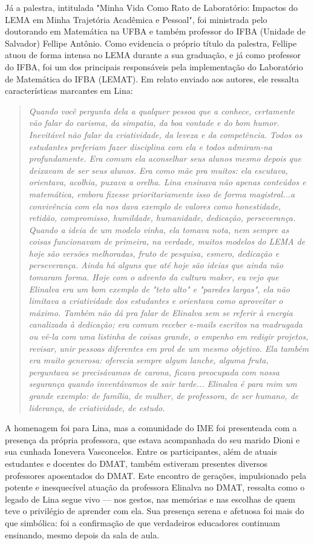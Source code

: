 \documentclass{hipatia}
\begin{document}
Já a palestra, intitulada "Minha Vida Como Rato de Laboratório: Impactos do LEMA em Minha Trajetória Acadêmica e Pessoal", foi ministrada pelo doutorando em Matemática na UFBA e também professor do IFBA (Unidade de Salvador) Fellipe Antônio. Como evidencia o próprio título da palestra, Fellipe atuou de forma intensa no LEMA durante a sua graduação, e já como professor do IFBA, foi um dos principais responsáveis pela implementação do Laboratório de Matemática do IFBA (LEMAT). Em relato enviado aos autores, ele ressalta características marcantes em Lina:
\begin{quote}
    \textit{Quando você pergunta dela a qualquer pessoa que a conhece, certamente vão falar do carisma, da simpatia, da boa vontade e do bom humor. Inevitável não falar da criatividade, da leveza e da competência. Todos os estudantes preferiam fazer disciplina com ela e todos admiram-na profundamente. Era comum ela aconselhar seus alunos mesmo depois que deixavam de ser seus alunos. Era como mãe pra muitos: ela escutava, orientava, acolhia, puxava a orelha. Lina ensinava não apenas conteúdos e matemática, embora fizesse prioritariamente isso de forma magistral...a convivência com ela nos dava exemplo de valores como honestidade, retidão, compromisso, humildade, humanidade, dedicação, perseverança. Quando a ideia de um modelo vinha, ela tomava nota, nem sempre as coisas funcionavam de primeira, na verdade, muitos modelos do LEMA de hoje são versões melhoradas, fruto de pesquisa, esmero, dedicação e perseverança. Ainda há alguns que até hoje são ideias que ainda não tomaram forma. Hoje com o advento da cultura maker, eu vejo que Elinalva era um bom exemplo de "teto alto" e "paredes largas", ela não limitava a criatividade dos estudantes  e orientava como aproveitar o máximo. Também não dá pra falar de Elinalva sem se referir à energia canalizada à dedicação; era comum receber e-mails escritos na madrugada ou vê-la com uma listinha de coisas grande, o empenho em redigir projetos, revisar, unir pessoas diferentes em prol de um mesmo objetivo. Ela também era muito generosa: oferecia sempre algum lanche, alguma fruta, perguntava se precisávamos de carona, ficava preocupada com nossa segurança quando inventávamos de sair tarde... Elinalva é para mim um grande exemplo: de família, de mulher, de professora, de ser humano, de liderança, de criatividade, de estudo.}
\end{quote}
A homenagem foi para Lina, mas a comunidade do IME foi presenteada com a presença da própria professora, que estava acompanhada do seu marido Dioni e sua cunhada Ionevera Vasconcelos. Entre os participantes, além de atuais estudantes e docentes do DMAT, também estiveram presentes diversos professores aposentados do DMAT. Este encontro de gerações, impulsionado pela potente e inesquecível atuação da professora Elinalva no DMAT, ressalta como o legado de Lina segue vivo — nos gestos, nas memórias e nas escolhas de quem teve o privilégio de aprender com ela. Sua presença serena e afetuosa foi mais do que simbólica: foi a confirmação de que verdadeiros educadores continuam ensinando, mesmo depois da sala de aula.
\end{document}
